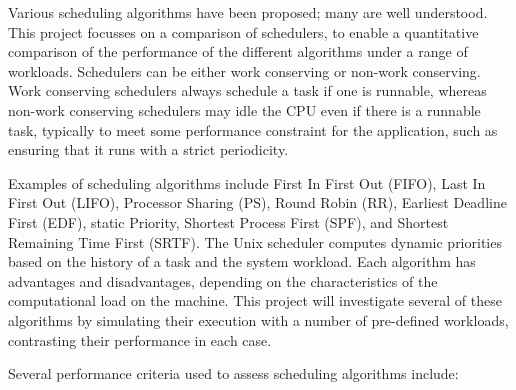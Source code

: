 \documentclass[12pt]{article}
\begin{document}
Various scheduling algorithms have been proposed; many are well
understood.  This project focusses on a comparison of schedulers, to
enable a quantitative comparison of the performance of the different
algorithms under a range of workloads.  Schedulers can be either work
conserving or non-work conserving.  Work conserving schedulers always
schedule a task if one is runnable, whereas non-work conserving
schedulers may idle the CPU even if there is a runnable task,
typically to meet some performance constraint for the application,
such as ensuring that it runs with a strict periodicity.

Examples of scheduling algorithms include First In First Out (FIFO),
Last In First Out (LIFO), Processor Sharing (PS), Round Robin (RR),
Earliest Deadline First (EDF), static Priority, Shortest Process First
(SPF), and Shortest Remaining Time First (SRTF).  The Unix scheduler
computes dynamic priorities based on the history of a task and the
system workload.  Each algorithm has advantages and disadvantages,
depending on the characteristics of the computational load on the
machine.  This project will investigate several of these algorithms by
simulating their execution with a number of pre-defined workloads,
contrasting their performance in each case.

Several performance criteria used to assess scheduling algorithms
include:
\end{document}
